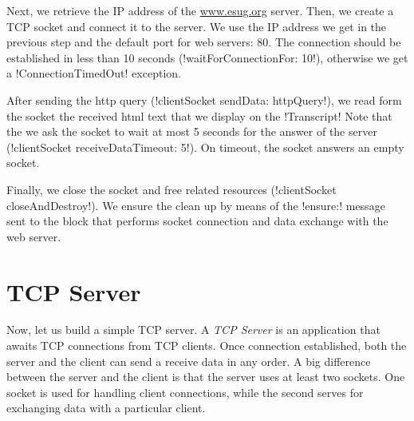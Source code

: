 \documentclass[a4paper,10pt,twoside]{book}
\begin{document}
Next, we retrieve the IP address of the \url{www.esug.org} server.
Then, we create a TCP socket and connect it to the server.
We use the IP address we get in the previous step and the default port for web servers: 80.
The connection should be established in less than 10 seconds (\ct!waitForConnectionFor: 10!), otherwise we get a \ct!ConnectionTimedOut! exception.

After sending the http query (\ct!clientSocket sendData: httpQuery!), we read form the socket the 
received html text that we display on the \ct!Transcript!
Note that the we ask the socket to wait at most 5 seconds for the answer of the server (\ct!clientSocket receiveDataTimeout: 5!).
On timeout, the socket answers an empty socket.

Finally, we  close the socket and free related resources (\ct!clientSocket closeAndDestroy!).
We ensure the clean up by means of the \ct!ensure:! message sent to the block that performs socket connection and data exchange with the web server.

\section{TCP Server}
\label{sec:serverTcpSocket}
Now, let us build a simple TCP server. A \textit{TCP Server} is an application that awaits TCP connections from TCP clients. Once connection established, both the server and the client can send a receive data in any order. 
A big difference between the server and the client is that the server uses at least two sockets.
One socket is used for handling client connections, while the second serves for exchanging data with a particular client. 

\end{document}
